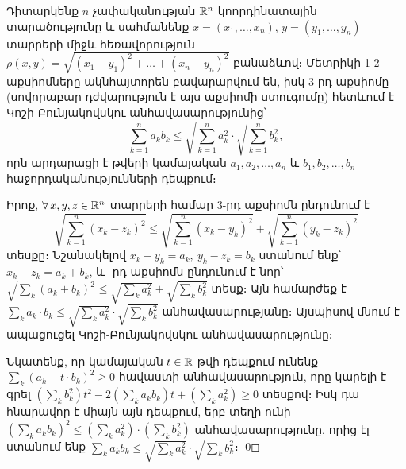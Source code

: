 \documentclass[./main.tex]{subfiles}
\begin{document}
\begin{example}\label{ch7ex3}
Դիտարկենք $n$ չափականության $\mathbb{R}^n$ կոորդինատային տարածությու\-նը և սահմանենք $x=(x_1,\dots,x_n )$, $y=(y_1,\dots,y_n)$ տարրերի միջև հեռավորություն $\rho(x,y)=\sqrt{(x_1-y_1)^2+ \dots +(x_n-y_n)^2}$ բանաձևով։ Մետրիկի 1-2 աքսիոմները ակն\-հայ\-տո\-րեն բավարարվում են, իսկ 3-րդ աքսիոմը (սովորաբար դժվարություն է այս աքսիոմի ստուգումը) հետևում է Կոշի-Բունյակովսկու ան\-հա\-վա\-սա\-րու\-թյու\-նից՝
\[ \sum_{k=1}^n a_k b_k \leq \sqrt{\sum_{k=1}^n a_k^2}\cdot \sqrt{\sum_{k=1}^n b_k^2},
\]
որն արդարացի է թվերի կամայական $a_1, a_2, \dots, a_n$ և $b_1, b_2, \dots, b_n$ հաջորդա\-կա\-նու\-թյունների դեպքում։
\par Իրոք, $\forall x,y,z \in \R^n$ տարրերի համար 3-րդ աքսիոմն ընդունում է 
\[\sqrt{\sum_{k=1}^n (x_k-z_k)^2}\leq \sqrt{\sum_{k=1}^n (x_k-y_k)^2} +\sqrt{\sum_{k=1}^n (y_k-z_k)^2}
\]
տեսքը։ Նշանակելով $x_k-y_k=a_k,\ y_k-z_k=b_k$ ստանում ենք՝ $x_k-z_k=a_k+b_k$, և -րդ աքսիոմն ընդունում է նոր՝ $\sqrt{\sum\limits_k (a_k+b_k)^2} \leq \sqrt{\sum\limits_k a_k^2} + \sqrt{\sum\limits_k b_k^2}$ տեսք։ Այն համար\-ժեք է ${\sum\limits_k a_k \cdot b_k \leq \sqrt{\sum\limits_k a_k^2}} \cdot {\sqrt{\sum\limits_k b_k^2}}$ անհավասարությանը։ Այսպիսով մնում է ապացու\-ցել Կոշի-Բունյակովսկու անհավասարությունը։

\par Նկատենք, որ կամայական $t \in \mathbb{R}$ թվի դեպքում ունենք $\sum\limits_k \left(a_k-t\cdot b_k\right)^2 \geq 0$ հավաստի անհավասարություն, որը կարելի է գրել $\left(\sum\limits_k b_k^2\right) t^2-2\left(\sum\limits_k a_k b_k\right)t+\left(\sum\limits_k a_k^2 \right) \geq 0$ տեսքով։ Իսկ դա հնարավոր է միայն այն դեպքում, երբ տեղի ունի $\left(\sum\limits_k a_k b_k\right)^2 \leq \left(\sum\limits_k a_k^2\right)\cdot\left(\sum\limits_k b_k^2\right)$ անհավասարությունը, որից էլ ստանում ենք \linebreak $\sum\limits_k a_k b_k \leq \sqrt{\sum\limits_k a_k^2} \cdot \sqrt{\sum\limits_k b_k^2}$։ \qed
\end{example}
\end{document}
